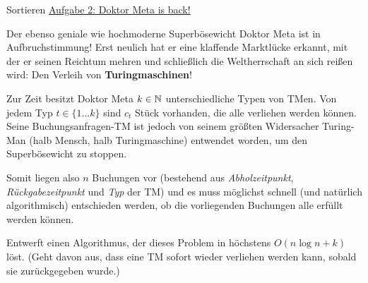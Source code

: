 \begin{frame}{Sortieren}
	\underline{Aufgabe 2: Doktor Meta is back!} \\[0,125cm]
	{	\small
		Der ebenso geniale wie hochmoderne Superbösewicht Doktor Meta ist in Aufbruchstimmung! Erst neulich hat er eine klaffende Marktlücke erkannt, mit der er seinen Reichtum mehren und schließlich die Weltherrschaft an sich reißen wird: Den Verleih von \textbf{Turingmaschinen}!
		
		Zur Zeit besitzt Doktor Meta $k \in \mathbb{N}$ unterschiedliche Typen von TMen. Von jedem Typ $t \in \{1 ... k\}$ sind $c_t$ Stück vorhanden, die alle verliehen werden können. Seine Buchungsanfragen-TM ist jedoch von seinem größten Widersacher Turing-Man (halb Mensch, halb Turingmaschine) entwendet worden, um den Superbösewicht zu stoppen. 
		
		Somit liegen also $n$ Buchungen vor (bestehend aus \emph{Abholzeitpunkt}, \textit{Rückgabezeitpunkt} und \emph{Typ} der TM) und es muss möglichst schnell (und natürlich algorithmisch) entschieden werden, ob die vorliegenden Buchungen alle erfüllt werden können.	
			
		Entwerft einen Algorithmus, der dieses Problem in höchstens $O(n \log n + k)$  löst.
		(Geht davon aus, dass eine TM sofort wieder verliehen werden kann, sobald sie zurückgegeben wurde.)
	}
\end{frame}

